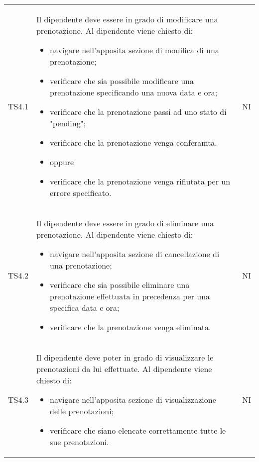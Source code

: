 {\begin{longtable}{ c C{11cm} c }
        TS4.1&
        \begin{flushleft}
            Il dipendente deve essere in grado di modificare una prenotazione.
            Al dipendente viene chiesto di:
        \end{flushleft}
        \begin{itemize}
            \item navigare nell'apposita sezione di modifica di una prenotazione;
            \item verificare che sia possibile modificare una prenotazione specificando una nuova data e ora;
            \item verificare che la prenotazione passi ad uno stato di "pending";
            \item verificare che la prenotazione venga conferamta.
            \item [] oppure
            \item verificare che la prenotazione venga rifiutata per un errore specificato.
        \end{itemize}&
        NI\\

        TS4.2&
        \begin{flushleft}
            Il dipendente deve essere in grado di eliminare una prenotazione.
            Al dipendente viene chiesto di:
        \end{flushleft}
        \begin{itemize}
            \item navigare nell'apposita sezione di cancellazione di una prenotazione;
            \item verificare che sia possibile eliminare una prenotazione effettuata in precedenza per una specifica data e ora;
            \item verificare che la prenotazione venga eliminata.
        \end{itemize}&
        NI\\

        TS4.3&
        \begin{flushleft}
            Il dipendente deve poter in grado di visualizzare le prenotazioni da lui effettuate.
            Al dipendente viene chiesto di:
        \end{flushleft}
        \begin{itemize}
            \item navigare nell'apposita sezione di visualizzazione delle prenotazioni;
            \item verificare che siano elencate correttamente tutte le sue prenotazioni.
        \end{itemize}&
        NI\\


\end{longtable}}
